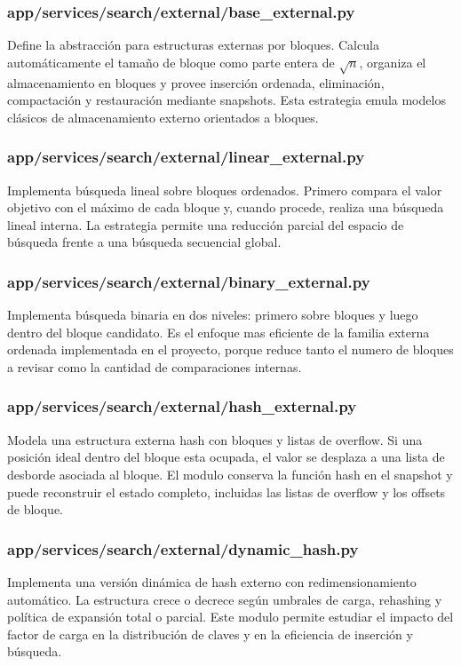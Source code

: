 \documentclass[12pt,onecolumn]{IEEEtran}
\begin{document}
\subsubsection{app/services/search/external/base\_external.py}
Define la abstracción para estructuras externas por bloques. Calcula automáticamente el tamaño de bloque como parte entera de $\sqrt{n}$, organiza el almacenamiento en bloques y provee inserción ordenada, eliminación, compactación y restauración mediante snapshots. Esta estrategia emula modelos clásicos de almacenamiento externo orientados a bloques.

\subsubsection{app/services/search/external/linear\_external.py}
Implementa búsqueda lineal sobre bloques ordenados. Primero compara el valor objetivo con el máximo de cada bloque y, cuando procede, realiza una búsqueda lineal interna. La estrategia permite una reducción parcial del espacio de búsqueda frente a una búsqueda secuencial global.

\subsubsection{app/services/search/external/binary\_external.py}
Implementa búsqueda binaria en dos niveles: primero sobre bloques y luego dentro del bloque candidato. Es el enfoque mas eficiente de la familia externa ordenada implementada en el proyecto, porque reduce tanto el numero de bloques a revisar como la cantidad de comparaciones internas.

\subsubsection{app/services/search/external/hash\_external.py}
Modela una estructura externa hash con bloques y listas de overflow. Si una posición ideal dentro del bloque esta ocupada, el valor se desplaza a una lista de desborde asociada al bloque. El modulo conserva la función hash en el snapshot y puede reconstruir el estado completo, incluidas las listas de overflow y los offsets de bloque.

\subsubsection{app/services/search/external/dynamic\_hash.py}
Implementa una versión dinámica de hash externo con redimensionamiento automático. La estructura crece o decrece según umbrales de carga, rehashing y política de expansión total o parcial. Este modulo permite estudiar el impacto del factor de carga en la distribución de claves y en la eficiencia de inserción y búsqueda.
\end{document}
